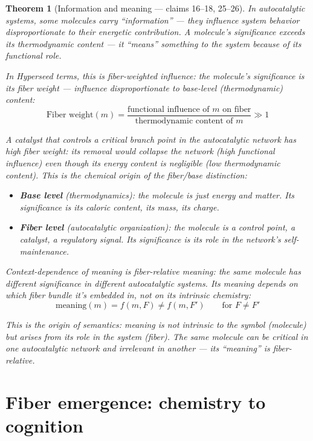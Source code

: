 \documentclass[11pt,a4paper]{article}
\newtheorem{theorem}[definition]{Theorem}
\begin{document}
\begin{theorem}[Information and meaning --- claims 16--18, 25--26]
\label{thm:meaning}
In autocatalytic systems, some molecules carry ``information'' ---
they influence system behavior disproportionate to their energetic
contribution. A molecule's significance exceeds its thermodynamic
content --- it ``means'' something to the system because of its
functional role.

In Hyperseed terms, this is \emph{fiber-weighted influence}: the
molecule's significance is its fiber weight --- influence
disproportionate to base-level (thermodynamic) content:
\[
  \text{Fiber weight}(m) = \frac{\text{functional influence of } m
    \text{ on fiber}}{\text{thermodynamic content of } m} \gg 1
\]

A catalyst that controls a critical branch point in the autocatalytic
network has high fiber weight: its removal would collapse the network
(high functional influence) even though its energy content is
negligible (low thermodynamic content). This is the chemical origin
of the fiber/base distinction:
\begin{itemize}
\item \textbf{Base level} (thermodynamics): the molecule is just
  energy and matter. Its significance is its caloric content, its
  mass, its charge.
\item \textbf{Fiber level} (autocatalytic organization): the molecule
  is a control point, a catalyst, a regulatory signal. Its significance
  is its role in the network's self-maintenance.
\end{itemize}

Context-dependence of meaning is \emph{fiber-relative meaning}: the
same molecule has different significance in different autocatalytic
systems. Its meaning depends on which fiber bundle it's embedded in,
not on its intrinsic chemistry:
\[
  \text{meaning}(m) = f(m, F) \neq f(m, F') \qquad
  \text{for } F \neq F'
\]

This is the origin of semantics: meaning is not intrinsic to the
symbol (molecule) but arises from its role in the system (fiber).
The same molecule can be critical in one autocatalytic network and
irrelevant in another --- its ``meaning'' is fiber-relative.
\end{theorem}

\section{Fiber emergence: chemistry to cognition}
\label{sec:emergence}
\end{document}
